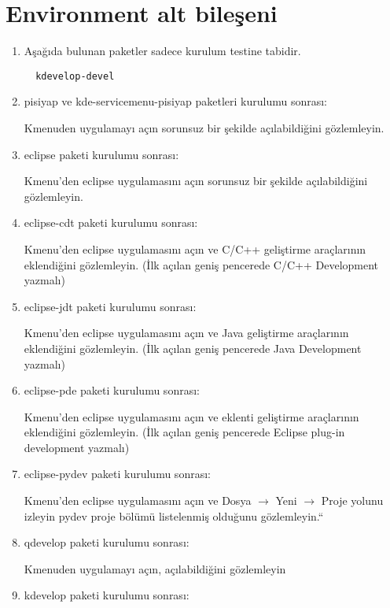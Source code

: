 \documentclass[a4paper,10pt]{article}
\begin{document}
\section{Environment alt bileşeni}
\begin{enumerate}

\item Aşağıda bulunan paketler sadece kurulum testine tabidir.

 \begin{verbatim}
  kdevelop-devel
 \end{verbatim}
\item pisiyap ve kde-servicemenu-pisiyap paketleri kurulumu sonrası:

Kmenuden uygulamayı açın sorunsuz bir şekilde açılabildiğini gözlemleyin.

\item eclipse paketi kurulumu sonrası:

Kmenu'den eclipse uygulamasını açın sorunsuz bir şekilde açılabildiğini gözlemleyin.

\item eclipse-cdt paketi kurulumu sonrası:

Kmenu'den eclipse uygulamasını açın ve C/C++ geliştirme araçlarının eklendiğini gözlemleyin. (İlk açılan geniş pencerede C/C++ Development yazmalı)

\item eclipse-jdt paketi kurulumu sonrası:

Kmenu'den eclipse uygulamasını açın ve Java geliştirme araçlarının eklendiğini gözlemleyin. (İlk açılan geniş pencerede Java Development yazmalı)

\item eclipse-pde paketi kurulumu sonrası:

Kmenu'den eclipse uygulamasını açın ve eklenti geliştirme araçlarının eklendiğini gözlemleyin. (İlk açılan geniş pencerede Eclipse plug-in development yazmalı)

\item eclipse-pydev paketi kurulumu sonrası:

Kmenu'den eclipse uygulamasını açın ve Dosya $\rightarrow$ Yeni $\rightarrow$ Proje yolunu izleyin pydev proje bölümü listelenmiş olduğunu gözlemleyin.``

\item qdevelop paketi kurulumu sonrası:

Kmenuden uygulamayı açın, açılabildiğini gözlemleyin

 \item kdevelop paketi kurulumu sonrası: 


\end{enumerate}
\end{document}
